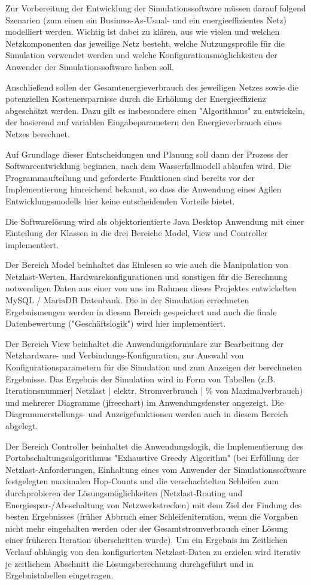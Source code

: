 \documentclass[12pt,titlepage]{article}
\begin{document}
Zur Vorbereitung der Entwicklung der Simulationssoftware müssen darauf folgend Szenarien (zum einen ein Business-As-Usual- und ein energieeffizientes Netz) modelliert werden. Wichtig ist dabei zu klären, aus wie vielen und welchen Netzkomponenten das jeweilige Netz besteht, welche Nutzungsprofile für die Simulation verwendet werden und welche Konfigurationsmöglichkeiten der Anwender der Simulationssoftware haben soll. 
 
Anschließend sollen der Gesamtenergieverbrauch des jeweiligen Netzes sowie die potenziellen Kostenersparnisse durch die Erhöhung der Energieeffizienz abgeschätzt werden. Dazu gilt es insbesondere einen "Algorithmus" zu entwickeln, der basierend auf variablen Eingabeparametern den Energieverbrauch eines Netzes berechnet. 
 
Auf Grundlage dieser Entscheidungen und Planung soll dann der Prozess der Softwareentwicklung beginnen, nach dem Wasserfallmodell ablaufen wird. Die Programmaufteilung und geforderte Funktionen sind bereits vor der Implementierung hinreichend bekannt, so dass die Anwendung eines Agilen Entwicklungsmodells hier keine entscheidenden Vorteile bietet.
 
Die Softwarelösung wird als objektorientierte Java Desktop Anwendung mit einer Einteilung der Klassen in die drei Bereiche Model, View und Controller implementiert.
 
Der Bereich Model beinhaltet das Einlesen so wie auch die Manipulation von Netzlast-Werten, Hardwarekonfigurationen und sonstigen für die Berechnung notwendigen Daten aus einer von uns im Rahmen dieses Projektes entwickelten MySQL / MariaDB Datenbank. Die in der Simulation errechneten Ergebnismengen werden in diesem Bereich gespeichert und auch die finale Datenbewertung ("Geschäftslogik") wird hier implementiert.
 
Der Bereich View beinhaltet die Anwendungsformulare zur Bearbeitung der Netz\-hard\-ware- und Verbindungs-Kon\-figura\-tion, zur Auswahl von Konfigurationsparametern für die Simulation und zum Anzeigen der berechneten Ergebnisse. Das Ergebnis der Simulation wird in Form von Tabellen (z.B. Iterationsnummer| Netzlast | elektr. Stromverbrauch | \% von Maximalverbrauch) und mehrerer Diagramme (jfreechart) im Anwendungsfenster angezeigt. Die Diagrammerstellungs- und Anzeigefunktionen werden auch in diesem Bereich abgelegt.
 
Der Bereich Controller beinhaltet die Anwendungslogik, die Implementierung des Portabschaltungsalgorithmus "Exhaustive Greedy Algorithm" (bei Erfüllung der Netzlast-Anforderungen, Einhaltung eines vom Anwender der Simulationssoftware festgelegten maximalen Hop-Counts und die verschachtelten Schleifen zum durchprobieren der Lösungs\-möglich\-keiten (Netzlast-Routing und Energiespar-/Ab-schaltung von Netzwerkstrecken) mit dem Ziel der Findung des besten Ergebnisses (früher Abbruch einer Schleifeniteration, wenn die Vorgaben nicht mehr eingehalten werden oder der Gesamtstromverbrauch einer Lösung einer früheren Iteration überschritten wurde). Um ein Ergebnis im Zeitlichen Verlauf abhängig von den konfigurierten Netzlast-Daten zu erzielen wird iterativ je zeitlichem Abschnitt die Lösungsberechnung durchgeführt und in Ergebnistabellen eingetragen.
 
\end{document}
